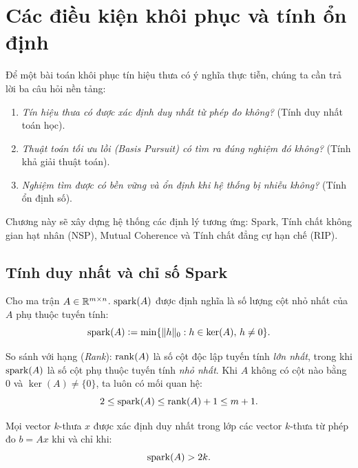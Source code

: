 \chapter{Các điều kiện khôi phục và tính ổn định}
\label{chap:dieu_kien_khoi_phuc}

Để một bài toán khôi phục tín hiệu thưa có ý nghĩa thực tiễn, chúng ta cần trả lời ba câu hỏi nền tảng:
\begin{enumerate}
    \item \emph{Tín hiệu thưa có được xác định duy nhất từ phép đo không?} (Tính duy nhất toán học).
    \item \emph{Thuật toán tối ưu lồi (Basis Pursuit) có tìm ra đúng nghiệm đó không?} (Tính khả giải thuật toán).
    \item \emph{Nghiệm tìm được có bền vững và ổn định khi hệ thống bị nhiễu không?} (Tính ổn định số).
\end{enumerate}
Chương này sẽ xây dựng hệ thống các định lý tương ứng: Spark, Tính chất không gian hạt nhân (NSP), Mutual Coherence và Tính chất đẳng cự hạn chế (RIP).

\section{Tính duy nhất và chỉ số Spark}
\begin{definition}
Cho ma trận $A \in \mathbb{R}^{m \times n}$. $\operatorname{spark}(A)$ được định nghĩa là số lượng cột nhỏ nhất của $A$ phụ thuộc tuyến tính:
\begin{equation}
    \operatorname{spark}(A) \mathrel{\mathop:}= \min \{ \|h\|_0 : h \in \ker(A), \, h \ne 0 \}.
\end{equation}
\end{definition}

So sánh với hạng (\emph{Rank}): $\operatorname{rank}(A)$ là số cột độc lập tuyến tính \emph{lớn nhất}, trong khi $\operatorname{spark}(A)$ là số cột phụ thuộc tuyến tính \emph{nhỏ nhất}. Khi $A$ không có cột nào bằng 0 và $\ker(A) \ne \{0\}$, ta luôn có mối quan hệ:
\begin{equation}
    2 \le \operatorname{spark}(A) \le \operatorname{rank}(A) + 1 \le m + 1.
\end{equation}

\begin{theorem}
Mọi vector $k$-thưa $x$ được xác định duy nhất trong lớp các vector $k$-thưa từ phép đo $b = Ax$ khi và chỉ khi:
\begin{equation}
    \operatorname{spark}(A) > 2k.
    \label{eq:spark_condition}
\end{equation}
\end{theorem}

